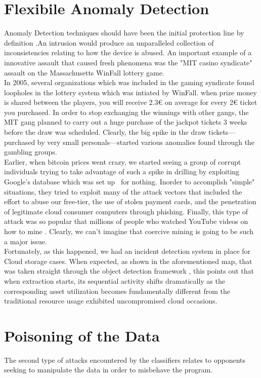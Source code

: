\documentclass[journal,twoside,web]{ieeecolor}
\begin{document}
\section{Flexibile Anomaly Detection}
Anomaly Detection techniques should have been the initial protection line  by definition .An intrusion would produce an unparalleled collection of inconsistencies relating to how the device is abused.
An important example of a innovative assault that caused fresh phenomena was the "MIT casino syndicate" assault on the Massachusetts WinFall lottery game.\\
In 2005, several organizations which was included in the gaming syndicate found  loopholes in the lottery system which was intiated by WinFall. when prize money is shared between the players, you will receive 2.3€ on average for every 2€ ticket you purchased. In order to stop exchanging the winnings with other gangs, the MIT gang planned to carry out a huge purchase of the jackpot tickets 3 weeks before the draw was scheduled. Clearly, the big spike in the draw tickets—purchased by very small personals—started various anomalies found through the gambling groups.\\
Earlier, when bitcoin prices went crazy, we started seeing a group of corrupt individuals trying to take advantage of such a spike in drilling by exploiting Google's database which was set up  for nothing. Inorder to accomplish "simple" situations, they tried to exploit many of the attack vectors that included the effort to abuse our free-tier, the use of stolen payment cards, and the penetration of legitimate cloud consumer computers through phishing. Finally, this type of attack was so popular that millions of people who watched YouTube videos on how to mine . Clearly, we can't imagine that coercive mining is going to be such a major issue.\\
Fortunately, as this happened, we had an incident detection system in place for Cloud storage cases. When expected, as shown in the aforementioned map, that was taken straight through the object detection framework , this points out that when extraction starts, its sequential activity shifts dramatically as the corresponding asset utilization becomes fundamentally different from the traditional resource usage exhibited uncompromised cloud occasions.

\section{Poisoning of the Data}
The second type of attacks encountered by the classifiers relates to opponents seeking to manipulate the data in order to misbehave the program.
\end{document}
